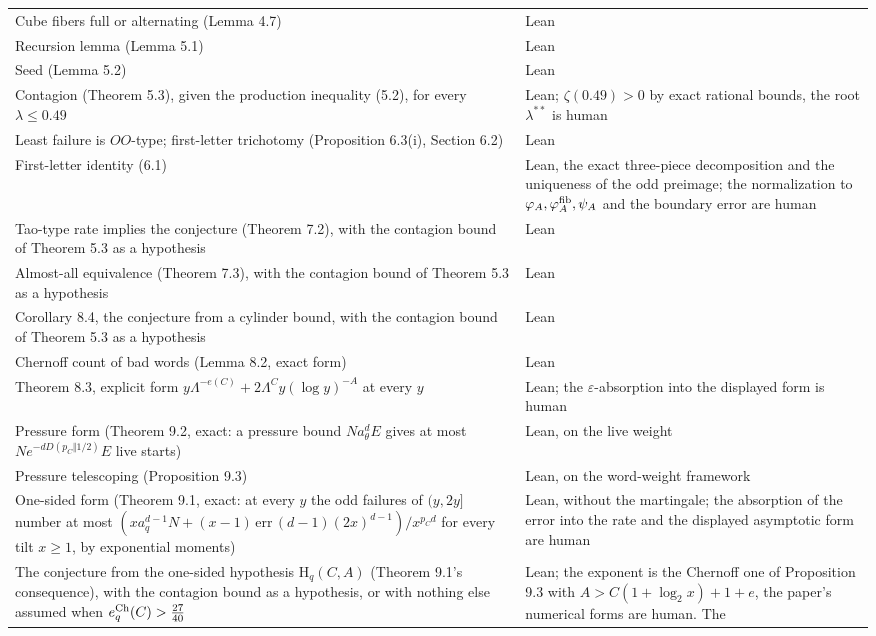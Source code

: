 \documentclass[11pt,a4paper]{article}
\begin{document}
\begin{longtable}[]{@{}
  >{\raggedright\arraybackslash}p{}
  >{\raggedright\arraybackslash}p{}@{}}
Cube fibers full or alternating (Lemma 4.7) & Lean \\
Recursion lemma (Lemma 5.1) & Lean \\
Seed (Lemma 5.2) & Lean \\
Contagion (Theorem 5.3), given the production inequality (5.2), for
every \(\lambda\le 0.49\) & Lean; \(\zeta(0.49)>0\) by exact rational
bounds, the root \(\lambda^{**}\) is human \\
Least failure is \(OO\)-type; first-letter trichotomy (Proposition
6.3(i), Section 6.2) & Lean \\
First-letter identity (6.1) & Lean, the exact three-piece decomposition
and the uniqueness of the odd preimage; the normalization to
\(\varphi_A,\varphi^{\rm fib}_A,\psi_A\) and the boundary error are
human \\
Tao-type rate implies the conjecture (Theorem 7.2), with the contagion
bound of Theorem 5.3 as a hypothesis & Lean \\
Almost-all equivalence (Theorem 7.3), with the contagion bound of
Theorem 5.3 as a hypothesis & Lean \\
Corollary 8.4, the conjecture from a cylinder bound, with the contagion
bound of Theorem 5.3 as a hypothesis & Lean \\
Chernoff count of bad words (Lemma 8.2, exact form) & Lean \\
Theorem 8.3, explicit form \(y\Lambda^{-e(C)}+2\Lambda^Cy(\log y)^{-A}\)
at every \(y\) & Lean; the \(\varepsilon\)-absorption into the displayed
form is human \\
Pressure form (Theorem 9.2, exact: a pressure bound \(Na_\theta^dE\)
gives at most \(Ne^{-dD(p_C\Vert 1/2)}E\) live starts) & Lean, on the
live weight \\
Pressure telescoping (Proposition 9.3) & Lean, on the word-weight
framework \\
One-sided form (Theorem 9.1, exact: at every \(y\) the odd failures of
\((y,2y]\) number at most
\((xa_q^{d-1}N+(x-1)\,\mathrm{err}\,(d-1)(2x)^{d-1})/x^{p_Cd}\) for
every tilt \(x\ge1\), by exponential moments) & Lean, without the
martingale; the absorption of the error into the rate and the displayed
asymptotic form are human \\
The conjecture from the one-sided hypothesis \(\mathrm H_q(C,A)\)
(Theorem 9.1's consequence), with the contagion bound as a hypothesis,
or with nothing else assumed when \(e^{\rm Ch}_q(C)>\tfrac{27}{40}\) &
Lean; the exponent is the Chernoff one of Proposition 9.3 with
\(A>C(1+\log_2x)+1+e\), the paper's numerical forms are human. The

\end{longtable}
\end{document}
